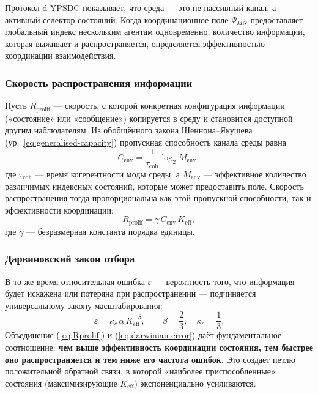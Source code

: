 \documentclass[12pt,a4paper]{article}
\theoremstyle{remark}
\begin{document}
	Протокол d-YPSDC показывает, что среда — это не пассивный канал, а активный селектор состояний. Когда координационное поле $\Psi_{MN}$ предоставляет глобальный индекс нескольким агентам одновременно, количество информации, которая выживает и распространяется, определяется эффективностью координации взаимодействия.
	
	\subsubsection*{Скорость распространения информации}
	Пусть $R_{\mathrm{prolif}}$ — скорость, с которой конкретная конфигурация информации («состояние» или «сообщение») копируется в среду и становится доступной другим наблюдателям. Из обобщённого закона Шеннона–Якушева (ур.~\ref{eq:generalised-capacity}) пропускная способность канала среды равна
	\[
	C_{\mathrm{env}} = \frac{1}{\tau_{\mathrm{coh}}} \log_2 M_{\mathrm{env}},
	\]
	где $\tau_{\mathrm{coh}}$ — время когерентности моды среды, а $M_{\mathrm{env}}$ — эффективное количество различимых индексных состояний, которые может предоставить поле. Скорость распространения тогда пропорциональна как этой пропускной способности, так и эффективности координации:
	\begin{equation}
		R_{\mathrm{prolif}} = \gamma \, C_{\mathrm{env}} \, K_{\mathrm{eff}},
		\label{eq:Rprolif}
	\end{equation}
	где $\gamma$ — безразмерная константа порядка единицы.
	
	\subsubsection*{Дарвиновский закон отбора}
	В то же время относительная ошибка $\varepsilon$ — вероятность того, что информация будет искажена или потеряна при распространении — подчиняется универсальному закону масштабирования:
	\begin{equation}
		\varepsilon = \kappa_c \, \alpha \, K_{\mathrm{eff}}^{-\beta},
		\qquad \beta = \frac{2}{3},\quad \kappa_c = \frac{1}{3}.
		\label{eq:darwinian-error}
	\end{equation}
	Объединение (\ref{eq:Rprolif}) и (\ref{eq:darwinian-error}) даёт фундаментальное соотношение: \textbf{чем выше эффективность координации состояния, тем быстрее оно распространяется и тем ниже его частота ошибок}. Это создает петлю положительной обратной связи, в которой «наиболее приспособленные» состояния (максимизирующие $K_{\mathrm{eff}}$) экспоненциально усиливаются.
	
\end{document}
